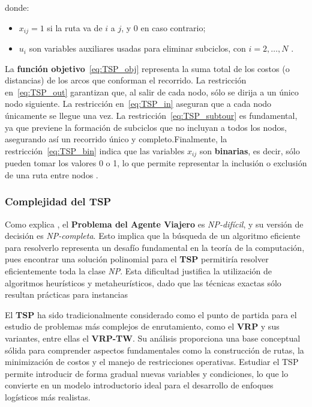 \documentclass[12pt,titlepage,twoside,openright]{book}
\begin{document}
\medskip

\noindent donde:
\begin{itemize}
	\item \(x_{ij} = 1\) si la ruta va de \(i\) a \(j\), y 0 en caso contrario;
	\item \(u_i\) son variables auxiliares usadas para eliminar subciclos, con \(i=2,\dots,N\) \citep{torres2018}.
\end{itemize}

La \textbf{función objetivo}~\eqref{eq:TSP_obj} representa la suma total de los costos (o distancias) de los arcos que conforman el recorrido. La restricción en~\eqref{eq:TSP_out} garantizan que, al salir de cada nodo, sólo se dirija a un único nodo siguiente. La restricción en~\eqref{eq:TSP_in} aseguran que a cada nodo únicamente se llegue una vez. La restricción~\eqref{eq:TSP_subtour} es fundamental, ya que previene la formación de subciclos que no incluyan a todos los nodos, asegurando así un recorrido único y completo.Finalmente, la restricción~\eqref{eq:TSP_bin} indica que las variables \(x_{ij}\) son \textbf{binarias}, es decir, sólo pueden tomar los valores 0 o 1, lo que permite representar la inclusión o exclusión de una ruta entre nodos \citep{torres2018}.

\subsubsection*{Complejidad del TSP}

Como explica \cite{papadimitriou1998}, el \textbf{Problema del Agente Viajero} es \textit{NP-difícil}, y su versión de decisión es \textit{NP-completa}. Esto implica que la búsqueda de un algoritmo eficiente para resolverlo representa un desafío fundamental en la teoría de la computación, pues encontrar una solución polinomial para el \textbf{TSP} permitiría resolver eficientemente toda la clase \textit{NP}. Esta dificultad justifica la utilización de algoritmos heurísticos y metaheurísticos, dado que las técnicas exactas sólo resultan prácticas para instancias

El \textbf{TSP} ha sido tradicionalmente considerado como el punto de partida para el estudio de problemas más complejos de enrutamiento, como el \textbf{VRP} y sus variantes, entre ellas el  \textbf{VRP-TW}. Su análisis proporciona una base conceptual sólida para comprender aspectos fundamentales como la construcción de rutas, la minimización de costos y el manejo de restricciones operativas. Estudiar el TSP permite introducir de forma gradual nuevas variables y condiciones, lo que lo convierte en un modelo introductorio ideal para el desarrollo de enfoques logísticos más realistas.
\end{document}
